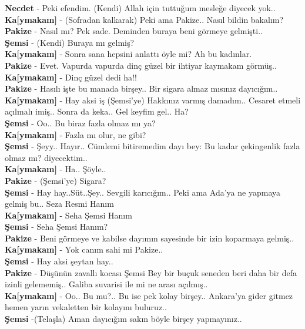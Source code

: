 \documentclass[]{book}
\begin{document}
\textbf{Necdet} - Peki efendim. (Kendi) Allah için tuttuğum mesleğe diyecek yok..\\
\textbf{Ka{[}ymakam{]}} - (Sofradan kalkarak) Peki ama Pakize.. Nasıl bildin bakalım?\\
\textbf{Pakize} - Nasıl mı? Pek sade. Deminden buraya beni görmeye gelmişti..\\
\textbf{Şemsi} - (Kendi) Buraya mı gelmiş?\\
\textbf{Ka{[}ymakam{]}} - Sonra sana hepsini anlattı öyle mi? Ah bu kadınlar.\\
\textbf{Pakize} - Evet. Vapurda vapurda dinç güzel bir ihtiyar kaymakam görmüş..\\
\textbf{Ka{[}ymakam{]}} - Dinç güzel dedi ha!!\\
\textbf{Pakize} - Hasılı işte bu manada birşey.. Bir sigara almaz mısınız dayıcığım..\\
\textbf{Ka{[}ymakam{]}} - Hay aksi iş (Şemsi'ye) Hakkınız varmış damadım.. Cesaret etmeli açılmalı imiş.. Sonra da keka.. Gel keyfim gel.. Ha?\\
\textbf{Şemsi} - Oo.. Bu biraz fazla olmaz mı ya?\\
\textbf{Ka{[}ymakam{]}} - Fazla mı olur, ne gibi?\\
\textbf{Şemsi} - Şeyy.. Hayır.. Cümlemi bitiremedim dayı bey: Bu kadar çekingenlik fazla olmaz mı? diyecektim..\\
\textbf{Ka{[}ymakam{]}} - Ha.. Şöyle..\\
\textbf{Pakize} - (Şemsi'ye) Sigara?\\
\textbf{Şemsi} - Hay hay..Süt..Şey.. Sevgili karıcığım.. Peki ama Ada'ya ne yapmaya gelmiş bu.. Seza Resmi Hanım\\
\textbf{Ka{[}ymakam{]}} - Seha Şemsi Hanım\\
\textbf{Şemsi} - Seha Şemsi Hanım?\\
\textbf{Pakize} - Beni görmeye ve kabilse dayımın sayesinde bir izin koparmaya gelmiş..\\
\textbf{Ka{[}ymakam{]}} - Yok canım sahi mi Pakize..\\
\textbf{Şemsi} - Hay aksi şeytan hay..\\
\textbf{Pakize} - Düşünün zavallı kocası Şemsi Bey bir buçuk seneden beri daha bir defa izinli gelememiş.. Galiba suvarisi ile mi ne arası açılmış..\\
\textbf{Ka{[}ymakam{]}} - Oo.. Bu mu?.. Bu ise pek kolay birşey.. Ankara'ya gider gitmez hemen yarın vekaletten bir kolayını buluruz..\\
\textbf{Şemsi} -(Telaşla) Aman dayıcığım sakın böyle birşey yapmayınız..\\
\end{document}
